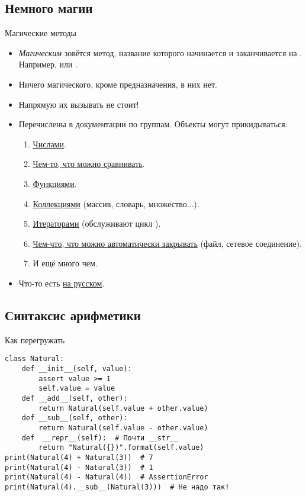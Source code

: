 \documentclass[utf8,xcolor=table]{beamer}
\renewcommand{\t}[1]{\ifmmode{\mathtt{#1}}\else{\texttt{#1}}\fi}
\begin{document}
\subsection{Немного магии}
\begin{frame}{Магические методы}
	\begin{itemize}
		\item
			\textit{Магическим} зовётся метод, название которого начинается и заканчивается на \t{\_\_}.
			Например, \t{\_\_init\_\_} или \t{\_\_str\_\_}.
		\item Ничего магического, кроме предназначения, в них нет.
		\item Напрямую их вызывать не стоит!
		\item Перечислены в документации по группам. Объекты могут прикидываться:
			\begin{enumerate}
				\item \href{https://docs.python.org/3/reference/datamodel.html\#emulating-numeric-types}{Числами}.
				\item \href{https://docs.python.org/3/reference/datamodel.html\#object.\_\_lt\_\_}{Чем-то, что можно сравнивать}.
				\item \href{https://docs.python.org/3/reference/datamodel.html\#emulating-callable-objects}{Функциями}.
				\item \href{https://docs.python.org/3/reference/datamodel.html\#emulating-container-types}{Коллекциями} (массив, словарь, множество...).
				\item \href{https://docs.python.org/3/library/stdtypes.html\#typeiter}{Итераторами} (обслуживают цикл \t{for}).
				\item \href{https://docs.python.org/3/reference/datamodel.html\#with-statement-context-managers}{Чем-что, что можно автоматически закрывать} (файл, сетевое соединение).
				\item И ещё много чем.
			\end{enumerate}
		\item Что-то есть \href{https://pythonworld.ru/osnovy/peregruzka-operatorov.html}{на русском}.
	\end{itemize}
\end{frame}

\subsection{Синтаксис арифметики}

\begin{frame}[fragile]{Как перегружать}
\begin{verbatim}
class Natural:
    def __init__(self, value):
        assert value >= 1
        self.value = value
    def __add__(self, other):
        return Natural(self.value + other.value)
    def __sub__(self, other):
        return Natural(self.value - other.value)
    def  __repr__(self):  # Почти __str__
        return "Natural({})".format(self.value)
print(Natural(4) + Natural(3))  # 7
print(Natural(4) - Natural(3))  # 1
print(Natural(4) - Natural(4))  # AssertionError
print(Natural(4).__sub__(Natural(3)))  # Не надо так!
\end{verbatim}
\end{frame}
\end{document}
